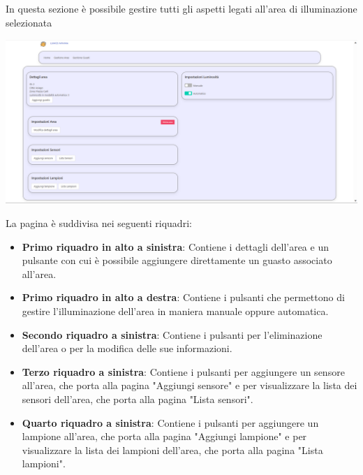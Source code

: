\documentclass[9pt]{article}
\begin{document}
In questa sezione è possibile gestire tutti gli aspetti legati all'area di illuminazione selezionata

\begin{center}
	\includegraphics[scale=0.3]{Area.png}
\end{center}

La pagina è suddivisa nei seguenti riquadri:
\begin{itemize}
	\item \textbf{Primo riquadro in alto a sinistra}: Contiene i dettagli dell'area e un pulsante con cui è possibile aggiungere direttamente un guasto associato all'area.
	\item \textbf{Primo riquadro in alto a destra}: Contiene i pulsanti che permettono di gestire l'illuminazione dell'area in maniera manuale oppure automatica.
	\item \textbf{Secondo riquadro a sinistra}: Contiene i pulsanti per l'eliminazione dell'area o per la modifica delle sue informazioni.
	\item \textbf{Terzo riquadro a sinistra}: Contiene i pulsanti per aggiungere un sensore all'area, che porta alla pagina "Aggiungi sensore" e per visualizzare la lista dei sensori dell'area, che porta alla pagina "Lista sensori".
	\item \textbf{Quarto riquadro a sinistra}: Contiene i pulsanti per aggiungere un lampione all'area, che porta alla pagina "Aggiungi lampione" e per visualizzare la lista dei lampioni dell'area, che porta alla pagina "Lista lampioni".
\end{itemize}
\end{document}
